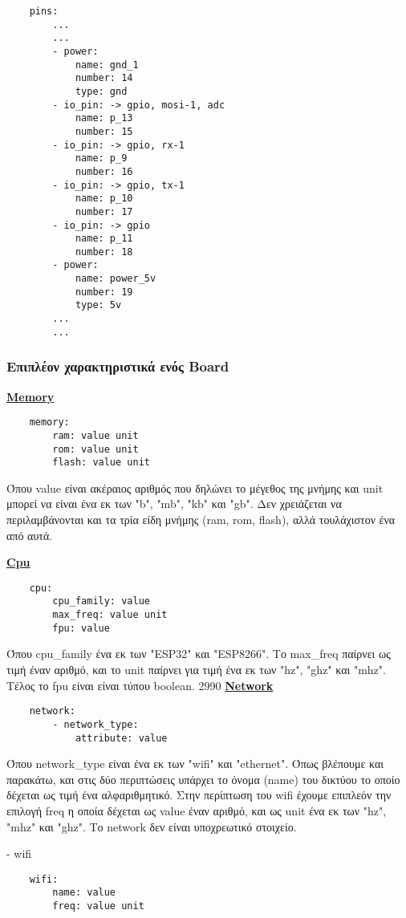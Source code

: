 \begin{lstlisting}
	pins:
		...
		...
		- power:
			name: gnd_1
			number: 14
			type: gnd
		- io_pin: -> gpio, mosi-1, adc
			name: p_13
			number: 15
		- io_pin: -> gpio, rx-1
			name: p_9
			number: 16
		- io_pin: -> gpio, tx-1
			name: p_10
			number: 17
		- io_pin: -> gpio
			name: p_11
			number: 18
		- power:
			name: power_5v
			number: 19
			type: 5v
		...
		...
\end{lstlisting}

\subsubsection{Επιπλέον χαρακτηριστικά ενός Board}

\textbf{\underline{Memory}}

\begin{lstlisting}
	memory:
		ram: value unit
		rom: value unit
		flash: value unit
\end{lstlisting}

Όπου value είναι ακέραιος αριθμός που δηλώνει το μέγεθος της μνήμης και unit μπορεί να είναι ένα εκ των "b", "mb", "kb" και "gb". Δεν χρειάζεται να περιλαμβάνονται και τα τρία είδη μνήμης (ram, rom, flash), αλλά τουλάχιστον ένα από αυτά.

\textbf{\underline{Cpu}}

\begin{lstlisting}
	cpu:
		cpu_family: value
		max_freq: value unit
		fpu: value
\end{lstlisting}

Όπου cpu\_family ένα εκ των "ESP32" και "ESP8266". Το max\_freq παίρνει ως τιμή έναν αριθμό, και το unit παίρνει για τιμή ένα εκ των "hz", "ghz" και "mhz". Τέλος το fpu είναι είναι τύπου boolean.
2990
\textbf{\underline{Network}}

\begin{lstlisting}
	network:
		- network_type:
			attribute: value
\end{lstlisting}

Όπου network\_type είναι ένα εκ των "wifi" και "ethernet". Όπως βλέπουμε και παρακάτω, και στις δύο περιπτώσεις υπάρχει το όνομα (name) του δικτύου το οποίο δέχεται ως τιμή ένα αλφαριθμητικό. Στην περίπτωση του wifi έχουμε επιπλεόν την επιλογή freq η οποία δέχεται ως value έναν αριθμό, και ως unit ένα εκ των "hz", "mhz" και "ghz". Το network δεν είναι υποχρεωτικό στοιχείο.

- wifi

\begin{lstlisting}
	wifi:
		name: value
		freq: value unit
\end{lstlisting}

